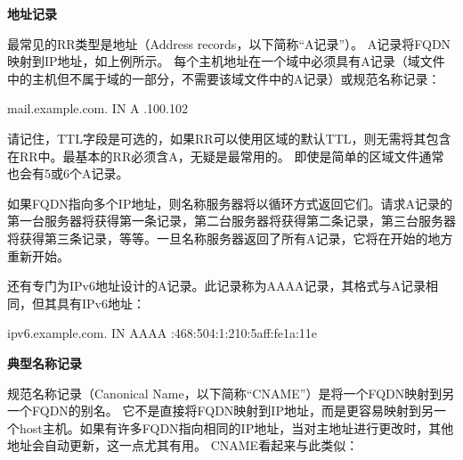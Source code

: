 ﻿\documentclass[english,runningheads,a4paper]{llncs}[2018/03/10]
\begin{document}
\vbox{}

\par\noindent\textbf{地址记录}

\par\noindent 最常见的RR类型是地址（Address records，以下简称“A记录”）。 A记录将FQDN映射到IP地址，如上例所示。 每个主机地址在一个域中必须具有A记录（域文件中的主机但不属于域的一部分，不需要该域文件中的A记录）或规范名称记录：

\par\setlength\parindent{2em}mail.example.com.  \qquad IN \qquad A .100.102

\par\setlength\parindent{2em}请记住，TTL字段是可选的，如果RR可以使用区域的默认TTL，则无需将其包含在RR中。最基本的RR必须含A，无疑是最常用的。 即使是简单的区域文件通常也会有5或6个A记录。

\par\setlength\parindent{2em}如果FQDN指向多个IP地址，则名称服务器将以循环方式返回它们。请求A记录的第一台服务器将获得第一条记录，第二台服务器将获得第二条记录，第三台服务器将获得第三条记录，等等。一旦名称服务器返回了所有A记录，它将在开始的地方重新开始。

\par\setlength\parindent{2em}还有专门为IPv6地址设计的A记录。此记录称为AAAA记录，其格式与A记录相同，但其具有IPv6地址：

\par\setlength\parindent{2em}ipv6.example.com.  \qquad IN \qquad AAAA :468:504:1:210:5aff:fe1a:11e

\vbox{}

\par\noindent\textbf{典型名称记录}

\par\noindent 规范名称记录（Canonical Name，以下简称“CNAME”）是将一个FQDN映射到另一个FQDN的别名。 它不是直接将FQDN映射到IP地址，而是更容易映射到另一个host主机。如果有许多FQDN指向相同的IP地址，当对主地址进行更改时，其他地址会自动更新，这一点尤其有用。 CNAME看起来与此类似：

\end{document}

